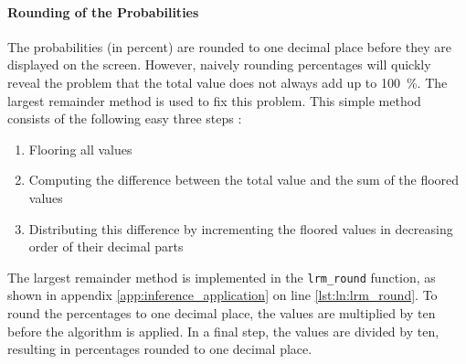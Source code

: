 \paragraph{Rounding of the Probabilities}
The probabilities (in percent) are rounded to one decimal place before they are displayed on the screen.
However, naively rounding percentages will quickly reveal the problem that the total value does not always add up to \SI{100}{\percent}.
The largest remainder method is used to fix this problem.
This simple method consists of the following easy three steps \cite{inf_percentage}:
\begin{enumerate}
  \item Flooring all values
  \item Computing the difference between the total value and the sum of the floored values
  \item Distributing this difference by incrementing the floored values in decreasing order of their decimal parts
\end{enumerate}

The largest remainder method is implemented in the \texttt{lrm\_round} function, as shown in appendix \ref{app:inference_application} on line \ref{lst:ln:lrm_round}. %
To round the percentages to one decimal place, the values are multiplied by ten before the algorithm is applied.
In a final step, the values are divided by ten, resulting in percentages rounded to one decimal place.

